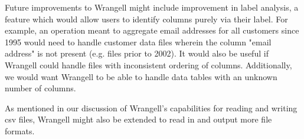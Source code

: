 \documentclass[preprint,nocopyrightspace]{sig-alternate}
\begin{document}
Future improvements to Wrangell might include improvement in label analysis, a feature which would allow users to identify columns purely via their label. For example, an operation meant to aggregate email addresses for all customers since 1995 would need to handle customer data files wherein the column "email address" is not present (e.g. files prior to 2002). It would also be useful if Wrangell could handle files with inconsistent ordering of columns. Additionally, we would want Wrangell to be able to handle data tables with an unknown number of columns. 

As mentioned in our discussion of Wrangell's capabilities for reading and writing csv files, Wrangell might also be extended to read in and output more file formats.   



\end{document}
